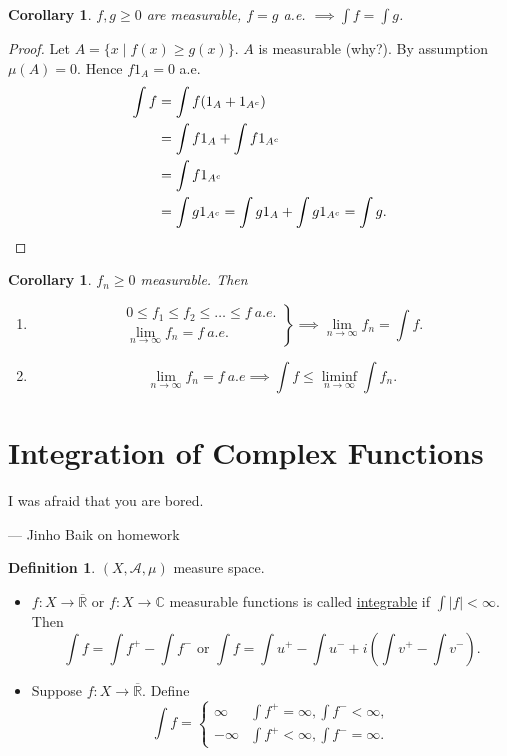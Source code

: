 \documentclass{report}
\newcommand{\R}{\mathbb{R}}
\newcommand{\C}{\mathbb{C}}
\newtheorem{corollary}[theorem]{Corollary}
\theoremstyle{definition}
\newtheorem{definition}[theorem]{Definition}
\theoremstyle{remark}
\begin{document}
\begin{corollary}
	$f, g \geq 0$ are measurable, $f = g$ a.e. $\implies \int f = \int g$.
\end{corollary}
\begin{proof}
	Let $A = \{x \mid f(x) \geq g(x)\}$. $A$ is measurable (why?). By assumption $\mu(A) = 0$. Hence $f1_A = 0$ a.e.
	\begin{align*}
		\int f & = \int f(1_A + 1_{A^c}) \\
		& = \int f1_A + \int f1_{A^c} \\
		& = \int f1_{A^c} \\
		& = \int g1_{A^c} = \int g1_{A} + \int g1_{A^c} = \int g. \qedhere
	\end{align*}
\end{proof}

\begin{corollary}
	$f_n \geq 0$ measurable. Then 
	\begin{enumerate}
		\item \[\left.\begin{array}{r}
			0 \leq f_1 \leq f_2 \leq  \ldots \leq f\ a.e. \\
			\lim_{n \to \infty} f_n = f\ a.e.
		\end{array}\right\} \implies \lim_{n \to \infty} f_n = \int f.\]
		\item \[
			\lim_{n \to \infty} f_n = f\ a.e \implies \int f \leq \liminf_{n \to \infty} \int f_n.	
		\]
	\end{enumerate}
\end{corollary}

\section{Integration of Complex Functions}
\epigraph{I was afraid that you are bored.}{--- \textup{Jinho Baik on homework}}
\begin{definition}
	$(X, \mathcal{A}, \mu)$ measure space. \begin{itemize}
		\item $f:X \to \overline{\R}$ or $f: X \to \C$ measurable functions is called \underline{integrable} if $\int |f| < \infty$. Then \[\int f = \int f^+ - \int f^- \text{ or } \int f = \int u^+ - \int u^- + i\left(\int v^+ - \int v^-\right).\]
		\item Suppose $f: X \to \overline{\R}$. Define \[\int f = \begin{cases}
			\infty & \displaystyle \int f^+ = \infty, \int f^- < \infty, \\[1em]
			-\infty & \displaystyle  \int f^+ < \infty, \int f^- = \infty.
		\end{cases}\]
	\end{itemize}
\end{definition}
\end{document}

